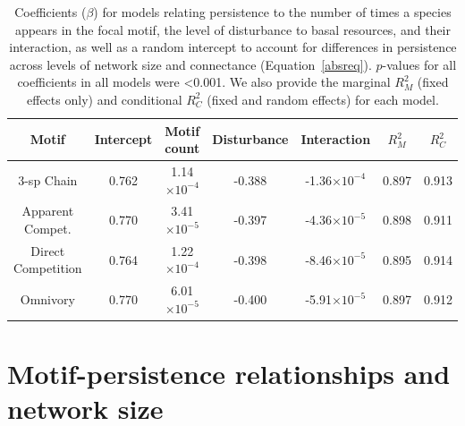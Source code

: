 \documentclass[12pt]{article}
\begin{document}
\begin{spacing}{2.0}
        \begin{table}[h!]
            \caption{Coefficients ($\beta$) for models relating persistence to the number of times a species appears in the focal motif, the level of disturbance to basal resources, and their interaction, as well as a random intercept to account for differences in persistence across levels of network size and connectance (Equation~\ref{absreq}). $p$-values for all coefficients in all models were \textless0.001. We also provide the marginal $R^2_M$ (fixed effects only) and conditional $R^2_C$ (fixed and random effects) for each model.}
            \label{tab:absolute_number}        \centering
            \begin{tabular}{c|c  c c  c | c c |}
            Motif & Intercept & Motif count & Disturbance & Interaction & $R^2_M$ & $R^2_C$ \\
            \hline
            3-sp Chain & 0.762 & 1.14$\times10^{-4}$ & -0.388 & -1.36$\times10^{-4}$ & 0.897 & 0.913 \\
            Apparent Compet. & 0.770 & 3.41$\times10^{-5}$ & -0.397 & -4.36$\times10^{-5}$ & 0.898 & 0.911\\
            Direct Competition & 0.764 & 1.22$\times10^{-4}$ & -0.398 & -8.46$\times10^{-5}$ & 0.895 & 0.914 \\
            Omnivory & 0.770 & 6.01$\times10^{-5}$ & -0.400 & -5.91$\times10^{-5}$ & 0.897 & 0.912 \\                
            \end{tabular}
            \end{table}
                
\clearpage
           
\section{Motif-persistence relationships and network size}


\end{spacing}
\end{document}
